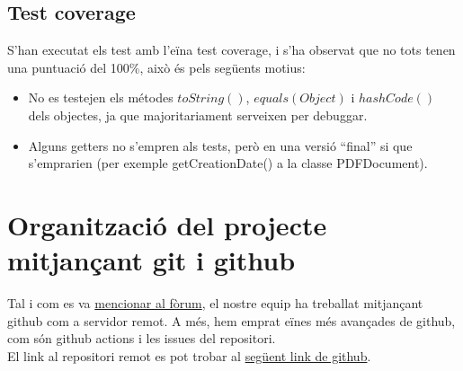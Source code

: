 \documentclass[12pt, letterpaper]{article}
\begin{document}
\subsection{Test coverage}
S'han executat els test amb l'eïna test coverage, i s'ha observat que no tots tenen una puntuació del 100\%, això és pels següents motius:
\begin{itemize}
  \item No es testejen els métodes $toString()$, $equals(Object)$ i $hashCode()$ dels objectes, ja que majoritariament serveixen per debuggar.
  \item Alguns getters no s'empren als tests, però en una versió ``final'' si que s'emprarien (per exemple getCreationDate() a la classe PDFDocument).
\end{itemize}

\section{Organització del projecte mitjançant git i github}
Tal i com es va  \href{https://cv.udl.cat/portal/site/102018-2122/tool/03e89a2d-c918-41df-84c4-3b8af0591e37/discussionForum/message/dfViewThread}{mencionar al fòrum}, el nostre equip ha treballat mitjançant github com a servidor remot. A més, hem emprat eïnes més avançades de github, com són github actions i les issues del repositori. \\

El link al repositori remot es pot trobar al \href{https://github.com/Pablito2020/Unified-Platform}{següent link de github}.
\end{document}
